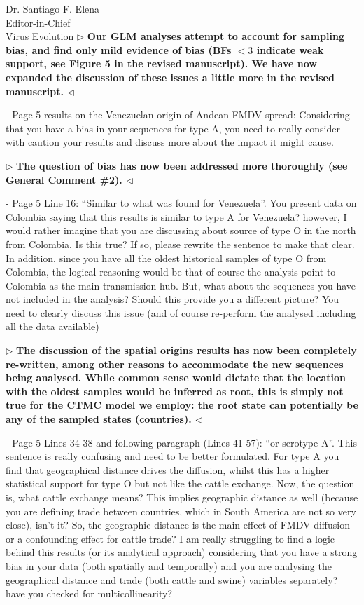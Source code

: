 \documentclass[12pt, a4paper]{letter} %
\newenvironment{reply}{$\triangleright$\bf}{$\triangleleft$}
\begin{document}
\begin{letter}{
	Dr. Santiago F. Elena\\
    Editor-in-Chief \\
    Virus Evolution
}
\begin{reply}
Our GLM analyses attempt to account for sampling bias, and find only mild evidence of bias (BFs $<3$ indicate weak support, see Figure 5 in the revised manuscript). 
We have now expanded the discussion of these issues a little more in the revised manuscript.
\end{reply}

-       Page 5 results on the Venezuelan origin of Andean FMDV spread: 
Considering that you have a bias in your sequences for type A, you need to really consider with caution your results and discuss more about the impact it might cause.

\begin{reply}
The question of bias has now been addressed more thoroughly (see General Comment \#2).
\end{reply}

-       Page 5 Line 16: ``Similar to what was found for Venezuela''. 
You present data on Colombia saying that this results is similar to type A for Venezuela? however, I would rather imagine that you are discussing about source of type O in the north from Colombia. 
Is this true? If so, please rewrite the sentence to make that clear. 
In addition, since you have all the oldest historical samples of type O from Colombia, the logical reasoning would be that of course the analysis point to Colombia as the main transmission hub. 
But, what about the sequences you have not included in the analysis? 
Should this provide you a different picture? 
You need to clearly discuss this issue (and of course re-perform the analysed including all the data available)

\begin{reply}
The discussion of the spatial origins results has now been completely re-written, among other reasons to accommodate the new sequences being analysed.
While common sense would dictate that the location with the oldest samples would be inferred as root, this is simply not true for the CTMC model we employ: the root state can potentially be any of the sampled states (countries).
\end{reply}

-       Page 5 Lines 34-38 and following paragraph (Lines 41-57): ``or serotype A''. 
This sentence is really confusing and need to be better formulated. 
For type A you find that geographical distance drives the diffusion, whilst this has a higher statistical support for type O but not like the cattle exchange. 
Now, the question is, what cattle exchange means? 
This implies geographic distance as well (because you are defining trade between countries, which in South America are not so very close), isn't it? 
So, the geographic distance is the main effect of FMDV diffusion or a confounding effect for cattle trade? 
I am really struggling to find a logic behind this results (or its analytical approach) considering that you have a strong bias in your data (both spatially and temporally) and you are analysing the geographical distance and trade (both cattle and swine) variables separately? have you checked for multicollinearity?


\end{letter}
\end{document}
